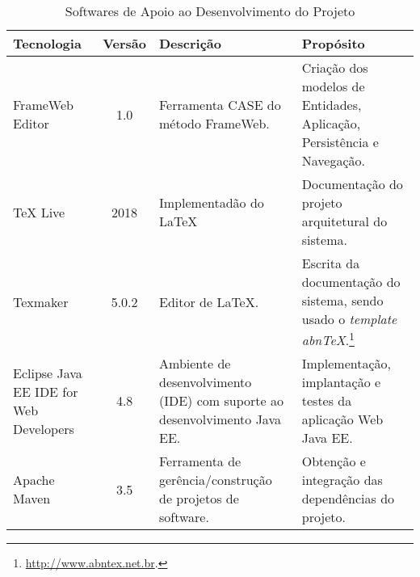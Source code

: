 \begin{table}[h]
	\centering	
	\vspace{0.5cm}
	\caption{Softwares de Apoio ao Desenvolvimento do Projeto}	
	\label{tabela-software}
	\begin{tabular}{|p{3cm}|c|p{5cm}|p{6cm}|}  \hline 
	
 		\rowcolor[rgb]{0.8,0.8,0.8} Tecnologia & Versão & Descrição & Propósito \\\hline 
 		 
		FrameWeb Editor & 1.0 & Ferramenta CASE do método FrameWeb. & Criação dos modelos de Entidades, Aplicação, Persistência e Navegação. \\\hline

		TeX Live  & 2018 & Implementadão do \LaTeX & Documentação do projeto arquitetural do sistema. \\\hline       
		
		Texmaker & 5.0.2 & Editor de \LaTeX. &  Escrita da documentação do sistema, sendo usado o \textit{template} \textit{abnTeX}.\footnote{\url{http://www.abntex.net.br}.} \\\hline      

		Eclipse Java EE IDE for Web Developers & 4.8 & Ambiente de desenvolvimento (IDE) com suporte ao desenvolvimento Java EE. & Implementação, implantação e testes da aplicação Web Java EE. \\\hline 
		
		Apache Maven & 3.5 & Ferramenta de gerência/construção de projetos de software. & Obtenção e integração das dependências do projeto. \\\hline
	\end{tabular}
\end{table}

